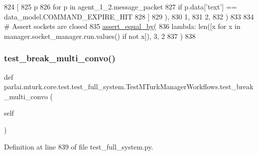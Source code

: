 \begin{DoxyCode}
824                 [
825                     p
826                     \textcolor{keywordflow}{for} p \textcolor{keywordflow}{in} agent\_1\_2.message\_packet
827                     \textcolor{keywordflow}{if} p.data[\textcolor{stringliteral}{'text'}] == data\_model.COMMAND\_EXPIRE\_HIT
828                 ]
829             ),
830             1,
831             2,
832         )
833 
834         \textcolor{comment}{# Assert sockets are closed}
835         \hyperlink{namespaceparlai_1_1mturk_1_1core_1_1test_1_1test__full__system_a0b463246d35658a2e422010f13dcf819}{assert\_equal\_by}(
836             \textcolor{keyword}{lambda}: len([x \textcolor{keywordflow}{for} x \textcolor{keywordflow}{in} manager.socket\_manager.run.values() \textcolor{keywordflow}{if} \textcolor{keywordflow}{not} x]), 3, 2
837         )
838 
\end{DoxyCode}
\mbox{\label{classparlai_1_1mturk_1_1core_1_1test_1_1test__full__system_1_1TestMTurkManagerWorkflows_add66c07d44176ab04d777af94f8f046a}} 
\subsubsection{\texorpdfstring{test\+\_\+break\+\_\+multi\+\_\+convo()}{test\_break\_multi\_convo()}}
{\footnotesize\ttfamily def parlai.\+mturk.\+core.\+test.\+test\+\_\+full\+\_\+system.\+Test\+M\+Turk\+Manager\+Workflows.\+test\+\_\+break\+\_\+multi\+\_\+convo (\begin{DoxyParamCaption}\item[{}]{self }\end{DoxyParamCaption})}



Definition at line 839 of file test\+\_\+full\+\_\+system.\+py.


